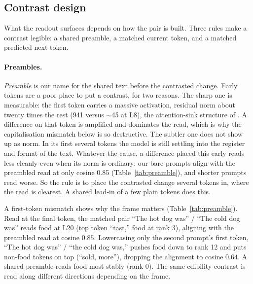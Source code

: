 \documentclass[11pt]{article}
\begin{document}
\subsection{Contrast design}
\label{sec:design}

What the readout surfaces depends on how the pair is built. Three rules make a
contrast legible: a shared preamble, a matched current token, and a matched
predicted next token.

\paragraph{Preambles.} \emph{Preamble}
is our name for the shared text before the contrasted change. Early tokens
are a poor place to put a contrast, for two reasons. The sharp one is
measurable: the first token carries a massive activation, residual norm about
twenty times the rest (941 versus $\sim$45 at L8), the attention-sink structure
of \citet{sun2026}. A difference on that token is amplified and dominates the
read, which is why the capitalisation mismatch below is so destructive. The 
subtler one does not show up as norm. In its first several tokens the model 
is still settling into the register and format of the text. Whatever the cause, 
a difference placed this early reads less cleanly even when its norm is ordinary: 
our bare prompts align with the preambled read at only cosine 0.85 
(Table~\ref{tab:preamble}), and shorter prompts read worse. So the rule is to place the
contrasted change several tokens in, where the read is clearest. A shared
lead-in of a few plain tokens does this.

A first-token mismatch shows why the frame matters (Table~\ref{tab:preamble}).
Read at the final token, the matched pair ``The hot dog was'' / ``The cold dog
was'' reads food at L20 (top token ``tast,'' food at rank 3), aligning with the
preambled read at cosine $0.85$. Lowercasing only the second prompt's first
token, ``The hot dog was'' / ``the cold dog was,'' pushes food down to rank 12
and puts non-food tokens on top (``sold, more''), dropping the alignment to
cosine $0.64$. A shared preamble reads food most stably (rank 0). The same
edibility contrast is read along different directions depending on the frame.
\end{document}
